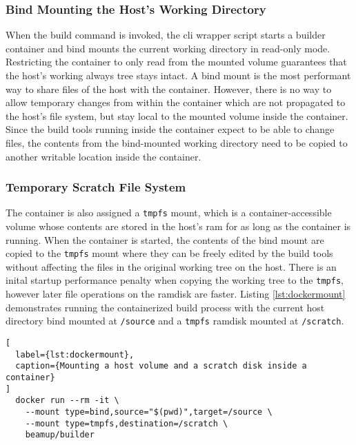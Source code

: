 \subsubsection{Bind Mounting the Host's Working Directory}
When the build command is invoked, the \acrshort{cli} wrapper script starts a builder container and bind mounts the current working directory in read-only mode. Restricting the container to only read from the mounted volume guarantees that the host's working always tree stays intact. A bind mount is the most performant way to share files of the host with the container.\cite{docker:docs} However, there is no way to allow temporary changes from within the container which are not propagated to the host's file system, but stay local to the mounted volume inside the container. Since the build tools running inside the container expect to be able to change files, the contents from the bind-mounted working directory need to be copied to another writable location inside the container.

\subsubsection{Temporary Scratch File System}
The container is also assigned a \lstinline|tmpfs| mount, which is a container-accessible volume whose contents are stored in the host's \acrshort{ram} for as long as the container is running.\cite{docker:docs} When the container is started, the contents of the bind mount are copied to the \lstinline|tmpfs| mount where they can be freely edited by the build tools without affecting the files in the original working tree on the host. There is an inital startup performance penalty when copying the working tree to the \lstinline|tmpfs|, however later file operations on the ramdisk are faster.
Listing \ref{lst:dockermount} demonstrates running the containerized build process with the current host directory bind mounted at \lstinline|/source| and a \lstinline|tmpfs| ramdisk mounted at \lstinline|/scratch|.

\begin{lstlisting}[
  label={lst:dockermount},
  caption={Mounting a host volume and a scratch disk inside a container}
]
  docker run --rm -it \
    --mount type=bind,source="$(pwd)",target=/source \
    --mount type=tmpfs,destination=/scratch \
    beamup/builder
\end{lstlisting}


